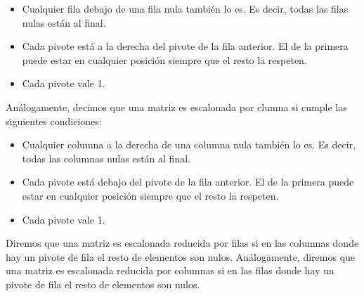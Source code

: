 \begin{itemize}
	\item
		Cualquier fila debajo de una fila nula también lo es.
		Es decir, todas las filas nulas están al final.
	\item
		Cada pivote está a la derecha del pivote de la fila anterior.
		El de la primera puede estar en cualquier posición siempre que el resto la respeten.
	\item
		Cada pivote vale 1.
\end{itemize}

Análogamente, decimos que una matriz es escalonada por clumna si cumple las siguientes condiciones:

\begin{itemize}
	\item
		Cualquier columna a la derecha de una columna nula también lo es.
		Es decir, todas las columnas nulas están al final.
	\item
		Cada pivote está debajo del pivote de la fila anterior.
		El de la primera puede estar en cualquier posición siempre que el resto la respeten.
	\item
		Cada pivote vale 1.
\end{itemize}

Diremos que una matriz es escalonada reducida por filas si en las columnas donde hay un pivote de fila el resto de elementos son nulos.
Análogamente, diremos que una matriz es escalonada reducida por columnas si en las filas donde hay un pivote de fila el resto de elementos son nulos.

